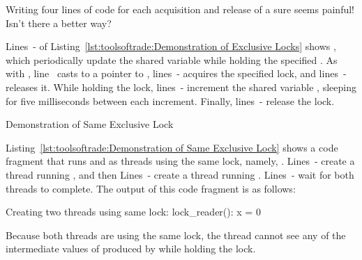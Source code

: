 \QuickQuiz{}
	Writing four lines of code for each acquisition and release
	of a  sure seems painful!
	Isn't there a better way?
 \QuickQuizEnd

\begin{lineref}
Lines~- of
Listing~\ref{lst:toolsoftrade:Demonstration of Exclusive Locks}
shows , which
periodically update the shared variable  while holding the
specified .
As with , line~ casts  to a pointer
to ,
lines~- acquires the specified lock,
and lines~- releases it.
While holding the lock, lines~-
increment the shared variable ,
sleeping for five milliseconds between each increment.
Finally, lines~- release the lock.
\end{lineref}

\begin{listing}[tbp]

\caption{Demonstration of Same Exclusive Lock}
\label{lst:toolsoftrade:Demonstration of Same Exclusive Lock}
\end{listing}

\begin{lineref}
Listing~\ref{lst:toolsoftrade:Demonstration of Same Exclusive Lock}
shows a code fragment that runs  and
 as threads using the same lock, namely, .
Lines~- create a thread
running , and then
Lines~- create a thread
running .
Lines~- wait for both threads to complete.
The output of this code fragment is as follows:
\end{lineref}

\begin{VerbatimU}
Creating two threads using same lock:
lock_reader(): x = 0
\end{VerbatimU}

Because both threads are using the same lock, the 
thread cannot see any of the intermediate values of  produced
by  while holding the lock.

